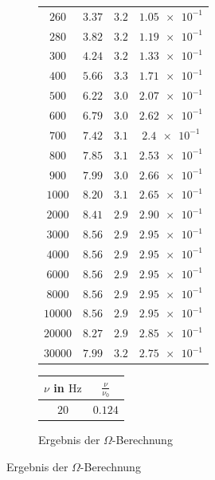 \begin{figure}
\begin{subfigure}{0.49\textwidth}
\begin{tabular}{S S S S}
     {$\num{260}$} & {$\num{3.37}$}  & {$\num{3.2}$} & {$\num{1.05e-1}$}  \\
     {$\num{280}$} & {$\num{3.82}$}  & {$\num{3.2}$} & {$\num{1.19e-1}$}  \\
     {$\num{300}$} & {$\num{4.24}$}  & {$\num{3.2}$} & {$\num{1.33e-1}$}  \\
     {$\num{400}$} & {$\num{5.66}$}  & {$\num{3.3}$} & {$\num{1.71e-1}$}  \\
     {$\num{500}$} & {$\num{6.22}$}  & {$\num{3.0}$} & {$\num{2.07e-1}$}  \\
     {$\num{600}$} & {$\num{6.79}$}  & {$\num{3.0}$} & {$\num{2.62e-1}$}  \\
     {$\num{700}$} & {$\num{7.42}$}  & {$\num{3.1}$} & {$\num{2.4e-1}$}  \\
     {$\num{800}$} & {$\num{7.85}$}  & {$\num{3.1}$} & {$\num{2.53e-1}$}  \\
     {$\num{900}$} & {$\num{7.99}$}  & {$\num{3.0}$} & {$\num{2.66e-1}$}  \\
     {$\num{1000}$} & {$\num{8.20}$}  & {$\num{3.1}$} & {$\num{2.65e-1}$}  \\
     {$\num{2000}$} & {$\num{8.41}$}  & {$\num{2.9}$} & {$\num{2.90e-1}$}  \\
     {$\num{3000}$} & {$\num{8.56}$}  & {$\num{2.9}$} & {$\num{2.95e-1}$}  \\
     {$\num{4000}$} & {$\num{8.56}$}  & {$\num{2.9}$} & {$\num{2.95e-1}$}  \\
     {$\num{6000}$} & {$\num{8.56}$}  & {$\num{2.9}$} & {$\num{2.95e-1}$}  \\
     {$\num{8000}$} & {$\num{8.56}$}  & {$\num{2.9}$} & {$\num{2.95e-1}$}  \\
     {$\num{10000}$} & {$\num{8.56}$}  & {$\num{2.9}$} & {$\num{2.95e-1}$}  \\
     {$\num{20000}$} & {$\num{8.27}$}  & {$\num{2.9}$} & {$\num{2.85e-1}$}  \\
     {$\num{30000}$} & {$\num{7.99}$}  & {$\num{3.2}$} & {$\num{2.75e-1}$}  \\
    \bottomrule
  \end{tabular}
 \end{subfigure}
\begin{subfigure}{0.49\textwidth}
\centering
\caption{Ergebnis der $\Omega$-Berechnung}
  \label{tab:Omega}
\begin{tabular}{S S }
    \toprule
    {$\nu$  in $\si{\hertz}$} &  {$\frac{\nu}{\nu_0}$} \\
    \midrule
    {$\num{20}$}   & {$\num{0.124}$} \\

\end{tabular}
\end{subfigure}
\end{figure}
